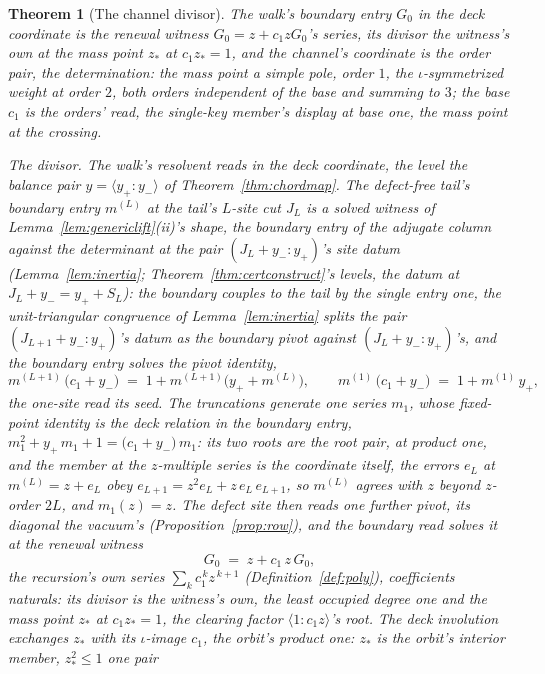 \documentclass[11pt]{article}
\newtheorem{theorem}{Theorem}
\theoremstyle{definition}
\begin{document}
\begin{theorem}[The channel divisor]\label{thm:channeldiv}
The walk's boundary entry $G_0$ in the deck coordinate is the
renewal witness $G_0=z+c_1zG_0$'s series, its divisor the witness's
own at the mass point $z_*$ at $c_1z_*=1$, and the
channel's coordinate is the order pair, the determination: the mass
point a simple pole, order $1$, the $\iota$-symmetrized weight at
order $2$, both orders independent of the base and summing to $3$;
the base $c_1$ is the orders' read, the single-key member's display
at base one, the mass point at the crossing.

\emph{The divisor.} The walk's resolvent reads in the deck
coordinate, the level the balance pair
$y=\langle y_+\!:\!y_-\rangle$ of Theorem~\ref{thm:chordmap}. The
defect-free tail's boundary entry $m^{(L)}$ at the
tail's $L$-site cut $J_L$ is a solved witness of
Lemma~\ref{lem:genericlift}(ii)'s shape, the boundary entry of the
adjugate column against the determinant at the pair
$(J_L+y_-\!:\!y_+)$'s site datum (Lemma~\ref{lem:inertia};
Theorem~\ref{thm:certconstruct}'s levels, the datum at
$J_L+y_-=y_++S_L$): the boundary
couples to the tail by the single entry one, the unit-triangular
congruence of Lemma~\ref{lem:inertia} splits the pair
$(J_{L+1}+y_-\!:\!y_+)$'s datum as
the boundary pivot against $(J_L+y_-\!:\!y_+)$'s, and the boundary entry
solves the pivot identity,
\[
m^{(L+1)}\,\big(c_1+y_-\big)\;=\;1+m^{(L+1)}\big(y_++m^{(L)}\big) ,
\qquad
m^{(1)}\,\big(c_1+y_-\big)\;=\;1+m^{(1)}\,y_+ ,
\]
the one-site read its seed. The truncations generate one series
$m_1$, whose fixed-point identity is the deck
relation in the boundary entry,
$m_1^2+y_+\,m_1+1=\big(c_1+y_-\big)\,m_1$: its
two roots are the root pair, at product one, and the member at the
$z$-multiple series is the coordinate itself, the errors $e_L$ at
$m^{(L)}=z+e_L$ obey
$e_{L+1}=z^2e_L+z\,e_L\,e_{L+1}$, so $m^{(L)}$ agrees with $z$
beyond $z$-order $2L$, and $m_1(z)=z$. The defect site then reads one
further pivot, its
diagonal the vacuum's (Proposition~\ref{prop:row}), and the boundary
read solves it at the renewal witness
\[
G_0\;=\;z+c_1\,z\,G_0 ,
\]
the recursion's own series $\sum_kc_1^{\,k}z^{\,k+1}$
(Definition~\ref{def:poly}), coefficients naturals: its divisor is
the witness's own, the least occupied degree one and the
\emph{mass point} $z_{*}$ at $c_1z_*=1$, the clearing factor
$\langle1\!:\!c_1z\rangle$'s root. The deck
involution exchanges $z_*$ with its $\iota$-image $c_1$, the orbit's product
one: $z_*$ is the orbit's interior member, $z_*^2\le1$ one pair

\end{theorem}
\end{document}
